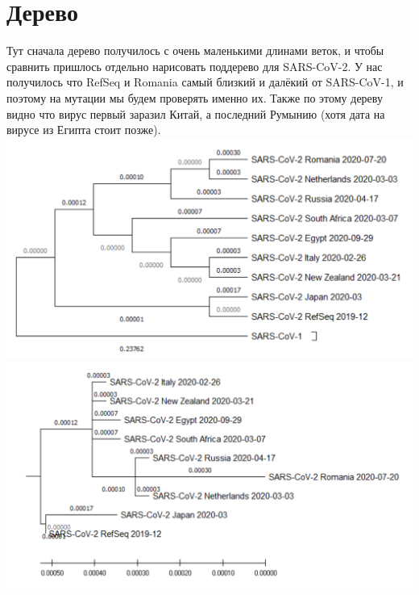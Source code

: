 \documentclass{article}
\begin{document}
  \section{Дерево}
  Тут сначала дерево получилось с очень маленькими длинами веток,
  и чтобы сравнить пришлось отдельно нарисовать поддерево для SARS-CoV-2.
  У нас получилось что RefSeq и Romania самый близкий и далёкий от SARS-CoV-1, и поэтому на мутации мы будем проверять именно их.
  Также по этому дереву видно что вирус первый заразил Китай, а последний Румынию (хотя дата на вирусе из Египта стоит позже). \\
  \includegraphics[width=.5\textwidth]{fulltree.png}\includegraphics[width=.5\textwidth]{deeptree.png}
\end{document}
